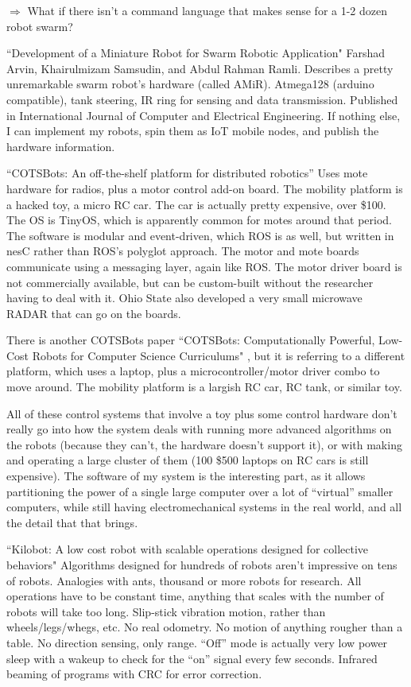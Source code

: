 \documentclass[]{article}
\begin{document}
$\Rightarrow$ What if there isn't a command language that makes sense for a 1-2 dozen robot swarm?

``Development of a Miniature Robot for Swarm Robotic Application" \cite{arvin2009development} Farshad Arvin, Khairulmizam Samsudin, and Abdul Rahman Ramli. Describes a pretty unremarkable swarm robot's hardware (called AMiR). Atmega128 (arduino compatible), tank steering, IR ring for sensing and data transmission. Published in International Journal of Computer and Electrical Engineering. If nothing else, I can implement my robots, spin them as IoT mobile nodes, and publish the hardware information. 

``COTSBots: An off-the-shelf platform for distributed robotics'' \cite{bergbreiter2003cotsbots} Uses mote hardware for radios, plus a motor control add-on board. The mobility platform is a hacked toy, a micro RC car. The car is actually pretty expensive, over \$100. The OS is TinyOS, which is apparently common for motes around that period. The software is modular and event-driven, which ROS is as well, but written in nesC rather than ROS's polyglot approach. The motor and mote boards communicate using a messaging layer, again like ROS. The motor driver board is not commercially available, but can be custom-built without the researcher having to deal with it. Ohio State also developed a very small microwave RADAR that can go on the boards.

There is another COTSBots paper ``COTSBots: Computationally Powerful, Low-Cost Robots for Computer Science Curriculums" \cite{soule2011cotsbots}, but it is referring to a different platform, which uses a laptop, plus a microcontroller/motor driver combo to move around. The mobility platform is a largish RC car, RC tank, or similar toy.

All of these control systems that involve a toy plus some control hardware don't really go into how the system deals with running more advanced algorithms on the robots (because they can't, the hardware doesn't support it), or with making and operating a large cluster of them (100 \$500 laptops on RC cars is still expensive). The software of my system is the interesting part, as it allows partitioning the power of a single large computer over a lot of ``virtual'' smaller computers, while still having electromechanical systems in the real world, and all the detail that that brings. 

``Kilobot: A low cost robot with scalable operations designed for collective behaviors" \cite{rubenstein2014kilobot} Algorithms designed for hundreds of robots aren't impressive on tens of robots. Analogies with ants, thousand or more robots for research. All operations have to be constant time, anything that scales with the number of robots will take too long. Slip-stick vibration motion, rather than wheels/legs/whegs, etc. No real odometry. No motion of anything rougher than a table. No direction sensing, only range. ``Off'' mode is actually very low power sleep with a wakeup to check for the ``on'' signal every few seconds. Infrared beaming of programs with CRC for error correction. 
\end{document}
